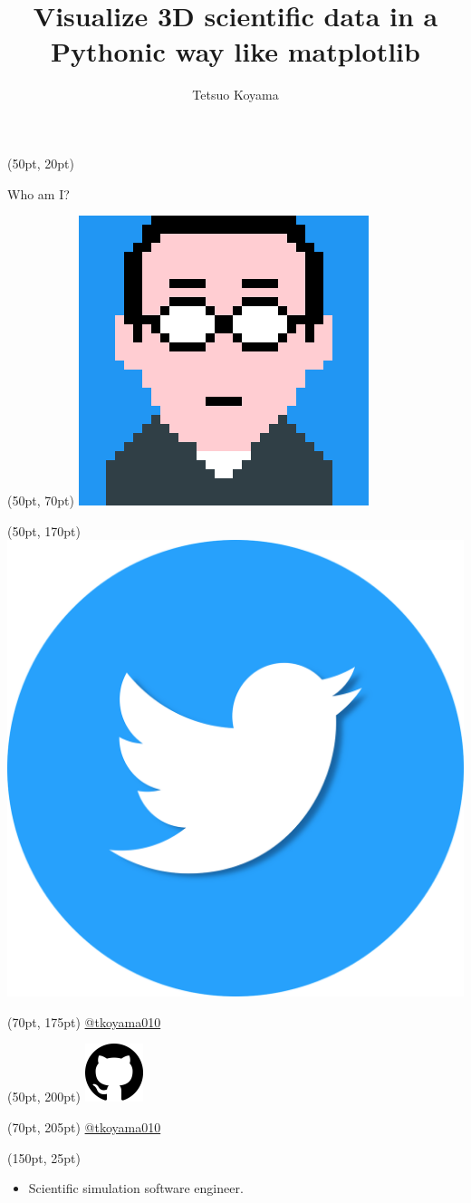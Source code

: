 \documentclass[aspectratio=169,12pt]{beamer}
\title{Visualize 3D scientific data in a Pythonic way like matplotlib}
\begin{document}
\author{Tetsuo Koyama}

\frame{\titlepage}

\begin{frame}[fragile]
\begin{textblock*}{350pt}(50pt, 20pt)
\begin{block}{Who am I?}
\end{block}
\end{textblock*}
\begin{textblock*}{350pt}(50pt, 70pt)
\includegraphics[width=0.25\linewidth]{tkoyama010.png}
\end{textblock*}
\begin{textblock*}{350pt}(50pt, 170pt)
\includegraphics[width=0.05\linewidth]{twitter-5662063_1280.png}
\end{textblock*}
\begin{textblock*}{350pt}(70pt, 175pt)
\href{https://twitter.com/tkoyama010}{@tkoyama010}
\end{textblock*}
\begin{textblock*}{350pt}(50pt, 200pt)
\includegraphics[width=0.05\linewidth]{github.png}
\end{textblock*}
\begin{textblock*}{350pt}(70pt, 205pt)
\href{https://github.com/tkoyama010}{@tkoyama010}
\end{textblock*}
\begin{textblock*}{350pt}(150pt, 25pt)
\begin{itemize}
\item Scientific simulation software engineer.
\end{itemize}
\end{textblock*}
\end{frame}
\end{document}
